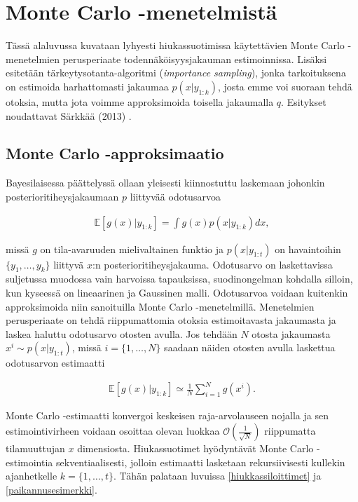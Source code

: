 \documentclass[
  12pt,
  a4paper, twoside]{book}
\begin{document}
\section{Monte Carlo -menetelmistä}

Tässä alaluvussa kuvataan lyhyesti hiukassuotimissa käytettävien Monte Carlo -menetelmien perusperiaate todennäköisyysjakauman estimoinnissa. Lisäksi esitetään tärkeytysotanta-algoritmi (\emph{importance sampling}), jonka tarkoituksena on estimoida harhattomasti jakaumaa \(p(x|y_{1:k})\), josta emme voi suoraan tehdä otoksia, mutta jota voimme approksimoida toisella jakaumalla \(q\). Esitykset noudattavat Särkkää (2013) \citep{sarkka-2013}.

\subsection{Monte Carlo -approksimaatio}

Bayesilaisessa päättelyssä ollaan yleisesti kiinnostuttu laskemaan johonkin posterioritiheysjakaumaan \(p\) liittyvää odotusarvoa

\begin{align}
\mathbb{E}[g(x)|y_{1:k}]=\int g(x)p(x|y_{1:k})dx,
\end{align}

\noindent missä \(g\) on tila-avaruuden mielivaltainen funktio ja \(p(x|y_{1:t})\) on havaintoihin \(\{y_1,\ldots,y_k\}\) liittyvä \(x\):n posterioritiheysjakauma. Odotusarvo on laskettavissa suljetussa muodossa vain harvoissa tapauksissa, suodinongelman kohdalla silloin, kun kyseessä on lineaarinen ja Gaussinen malli. Odotusarvoa voidaan kuitenkin approksimoida niin sanoituilla Monte Carlo -menetelmillä. Menetelmien perusperiaate on tehdä riippumattomia otoksia estimoitavasta jakaumasta ja laskea haluttu odotusarvo otosten avulla. Jos tehdään \(N\) otosta jakaumasta \(x^i\sim p(x|y_{1:t})\), missä \(i=\{1,\ldots,N\}\) saadaan näiden otosten avulla laskettua odotusarvon estimaatti

\begin{align}
\mathbb{E}[g(x)|y_{1:k}]\simeq\frac{1}{N}\sum_{i=1}^N g(x^i).
\end{align}

Monte Carlo -estimaatti konvergoi keskeisen raja-arvolauseen nojalla ja sen estimointivirheen voidaan osoittaa olevan luokkaa \(\mathcal{O}(\frac{1}{\sqrt{N}})\) riippumatta tilamuuttujan \(x\) dimensiosta. Hiukassuotimet hyödyntävät Monte Carlo -estimointia sekventiaalisesti, jolloin estimaatti lasketaan rekursiivisesti kullekin ajanhetkelle \(k=\{1,\ldots, t\}\). Tähän palataan luvuissa \ref{hiukkassiloittimet} ja \ref{paikannusesimerkki}.
\end{document}
